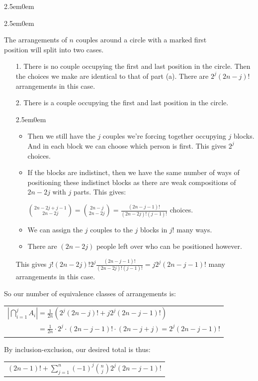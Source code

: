\documentclass{book}
\newcommand{\exTwoP}{%
   \color{RedViolet}%
   \fontsize{13}{15}\selectfont%
}
\newcommand{\exPPP}{%
   \color{VioletRed}%
   \fontsize{12}{14}\selectfont%
}
\newenvironment{myIndent}{%
   \begin{adjustwidth}{2.5em}{0em}%
}{%
   \end{adjustwidth}%
}
\newcommand{\retTwo}{\hfill\bigbreak}
\begin{document}
\begin{enumerate}
\begin{myIndent}
		\begin{myIndent}\exTwoP
			The arrangements of $n$ couples around a circle with a marked first\\ position will split into two cases.
			\begin{enumerate}
				\item[1.] There is no couple occupying the first and last position in the circle. Then the choices we make are identical to that of part (a). There are $2^j(2n -j)!$ arrangements in this case.
				\item[2.] There is a couple occupying the first and last position in the circle.
				\begin{myIndent}\exPPP
					\begin{itemize}
						\item Then we still have the $j$ couples we're forcing together occupying $j$ blocks. And in each block we can choose which person is first. This gives $2^j$ choices.
						\item If the blocks are indistinct, then we have the same number of ways of positioning these indistinct blocks as there are weak compositions of $2n - 2j$ with $j$ parts. This gives:
						
						{\centering $\binom{2n - 2j + j - 1}{2n - 2j} = \binom{2n - j}{2n - 2j} = \frac{(2n-j-1)!}{(2n-2j)!(j-1)!}$ choices.\par}

						\item We can assign the $j$ couples to the $j$ blocks in $j!$ many ways.
						\item There are $(2n-2j)$ people left over who can be positioned however.
					\end{itemize}

					This gives $j!(2n-2j)!2^j\frac{(2n-j-1)!}{(2n-2j)!(j-1)!} = j2^j(2n-j-1)!$ many arrangements in this case.\retTwo
				\end{myIndent}
			\end{enumerate}

			So our number of equivalence classes of arrangements is:

			{\centering\begin{tabular}{l}
				$|\bigcap\limits_{i=1}^j A_i| = \frac{1}{2n}\left( 2^j(2n-j)! + j2^j(2n-j-1)!\right)$ \\ [-8pt]
				$\phantom{|\bigcap\limits_{i=1}^j A_i|} = \frac{1}{2n}\cdot 2^j \cdot (2n -j - 1)!\cdot(2n - j + j) = 2^j(2n-j-1)!$
			\end{tabular} \retTwo\par}
		\end{myIndent}

		By inclusion-exclusion, our desired total is thus:

		{\centering\begin{tabular}{l}
			$(2n-1)! + \sum\limits_{j=1}^{n} (-1)^j\binom{n}{j}2^j(2n-j-1)!$
		\end{tabular}\newpage\par}
	\end{myIndent}
\end{enumerate}
\end{document}
